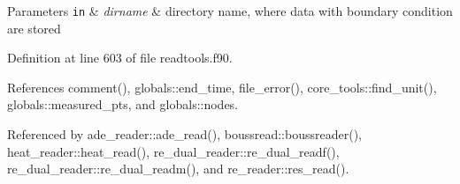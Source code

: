 \begin{DoxyParams}[1]{Parameters}
\mbox{\tt in}  & {\em dirname} & directory name, where data with boundary condition are stored \\
\hline
\end{DoxyParams}


Definition at line 603 of file readtools.\+f90.



References comment(), globals\+::end\+\_\+time, file\+\_\+error(), core\+\_\+tools\+::find\+\_\+unit(), globals\+::measured\+\_\+pts, and globals\+::nodes.



Referenced by ade\+\_\+reader\+::ade\+\_\+read(), boussread\+::boussreader(), heat\+\_\+reader\+::heat\+\_\+read(), re\+\_\+dual\+\_\+reader\+::re\+\_\+dual\+\_\+readf(), re\+\_\+dual\+\_\+reader\+::re\+\_\+dual\+\_\+readm(), and re\+\_\+reader\+::res\+\_\+read().


